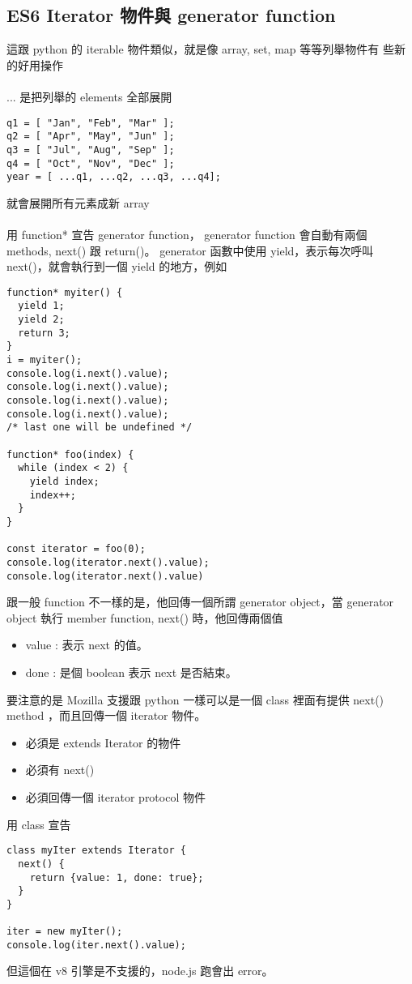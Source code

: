   \subsection{ES6 Iterator 物件與 generator function}
  這跟 python 的 iterable 物件類似，就是像 array, set, map 等等列舉物件有
  些新的好用操作
  \\\\
  ... 是把列舉的 elements 全部展開
  \begin{verbatim}
q1 = [ "Jan", "Feb", "Mar" ];
q2 = [ "Apr", "May", "Jun" ];
q3 = [ "Jul", "Aug", "Sep" ];
q4 = [ "Oct", "Nov", "Dec" ];
year = [ ...q1, ...q2, ...q3, ...q4];
  \end{verbatim}
  就會展開所有元素成新 array
  \\\\
  用 function* 宣告 generator function， generator function 會自動有兩個
  methods, next() 跟 return()。 generator 函數中使用 yield，表示每次呼叫
  next()，就會執行到一個 yield 的地方，例如
  \begin{verbatim}
function* myiter() {
  yield 1;
  yield 2;
  return 3;
}
i = myiter();
console.log(i.next().value);
console.log(i.next().value);
console.log(i.next().value);
console.log(i.next().value);
/* last one will be undefined */

function* foo(index) {
  while (index < 2) {
    yield index;
    index++;
  }
}

const iterator = foo(0);
console.log(iterator.next().value);
console.log(iterator.next().value)
  \end{verbatim}
  跟一般 function 不一樣的是，他回傳一個所謂 generator object，當 generator
  object 執行 member function, next() 時，他回傳兩個值
  \begin{itemize}
    \item value : 表示 next 的值。
    \item done : 是個 boolean 表示 next 是否結束。
  \end{itemize}
  要注意的是 Mozilla 支援跟 python 一樣可以是一個 class 裡面有提供 next()
  method ，而且回傳一個 iterator 物件。
  \begin{itemize}
    \item 必須是 extends Iterator 的物件
    \item 必須有 next()
    \item 必須回傳一個 iterator protocol 物件
  \end{itemize}
  用 class 宣告
  \begin{verbatim}
class myIter extends Iterator {
  next() {
    return {value: 1, done: true};
  }
}

iter = new myIter();
console.log(iter.next().value);
  \end{verbatim}
  但這個在 v8 引擎是不支援的，node.js 跑會出 error。

